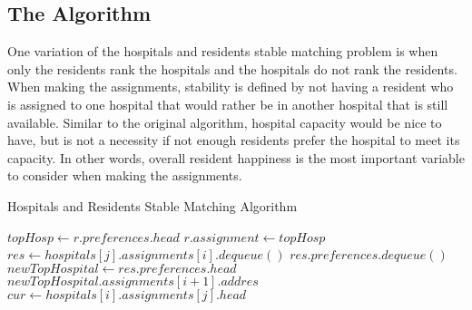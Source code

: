 \documentclass[letterpaper, 10pt,DIV=13]{scrartcl}
\numberwithin{equation}{section} %
\numberwithin{figure}{section} %
\numberwithin{table}{section} %
\begin{document}
\subsection{The Algorithm}
One variation of the hospitals and residents stable matching problem is when only the residents rank the hospitals and the hospitals do not rank the residents. When making the assignments, stability is defined by not having a resident who is assigned to one hospital that would rather be in another hospital that is still available. Similar to the original algorithm, hospital capacity would be nice to have, but is not a necessity if not enough residents prefer the hospital to meet its capacity. In other words, overall resident happiness is the most important variable to consider when making the assignments.

\begin{algorithm}
    \caption{Hospitals and Residents Stable Matching Algorithm}
    \label{algorithm:variation}
    \begin{algorithmic}[1]
            \State $topHosp \gets r.preferences.head$
            \State $r.assignment \gets topHosp$ 
          \EndFor
           
             
                 
                    \State $res \gets hospitals[j].assignments[i].dequeue()$ 
                    \State $res.preferences.dequeue()$ 
                        \State $newTopHospital \gets res.preferences.head$
                        \State $newTopHospital.assignments[i + 1].add{res}$ 
                    \EndIf
                \EndWhile
            \EndFor
          \EndFor
             
                \State $cur \gets hospitals[i].assignments[j].head$

\end{algorithmic}
\end{algorithm}
\end{document}
